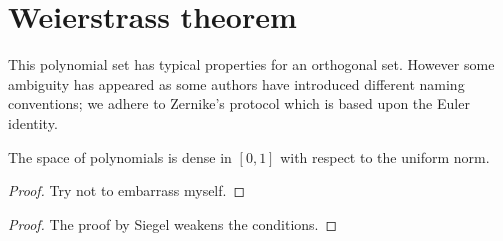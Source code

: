 \section{Weierstrass theorem}
This polynomial set has typical properties for an orthogonal set. However some ambiguity has appeared as some authors have introduced different naming conventions; we adhere to Zernike's protocol which is based upon the Euler identity.
 
\begin{myTheorem}
The space of polynomials is dense in $[0,1]$ with respect to the uniform norm.
\label{thm:Weierstrass}
\end{myTheorem}

\begin{proof}
Try not to embarrass myself.
\end{proof}

\begin{proof}
The proof by Siegel\cite{Siegel:1972} weakens the conditions.
\end{proof}

\cite{Siegel1972}
%


\endinput %